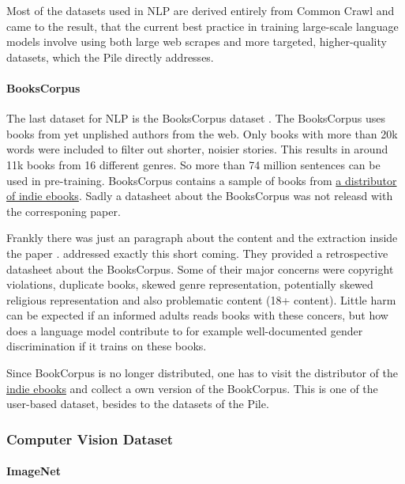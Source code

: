 \documentclass[
]{krantz}
\begin{document}
Most of the datasets used in NLP are derived entirely from Common Crawl and \citet{rosset2020turing} came to the result, that the current best practice in training large-scale language models involve using both large web scrapes and more targeted, higher-quality datasets, which the Pile directly addresses.

\hypertarget{bookscorpus}{%
\paragraph{BooksCorpus}\label{bookscorpus}}

The last dataset for NLP is the BooksCorpus dataset \citep{zhu2015aligning}. The BooksCorpus uses books from yet unplished authors from the web. Only books with more than 20k words were included to filter out shorter, noisier stories. This results in around 11k books from 16 different genres. So more than 74 million sentences can be used in pre-training. BooksCorpus contains a sample of books from \href{https://www.smashwords.com}{a distributor of indie ebooks}. Sadly a datasheet about the BooksCorpus was not releasd with the corresponing paper.

Frankly there was just an paragraph about the content and the extraction inside the paper \citep{zhu2015aligning}. \citet{bandy2021addressing} addressed exactly this short coming. They provided a retrospective datasheet about the BooksCorpus. Some of their major concerns were copyright violations, duplicate books, skewed genre representation, potentially skewed religious representation and also problematic content (18+ content). Little harm can be expected if an informed adults reads books with these concers, but how does a language model contribute to for example well-documented gender discrimination if it trains on these books.

Since BookCorpus is no longer distributed, one has to visit the distributor of the \href{https://www.smashwords.com}{indie ebooks} and collect a own version of the BookCorpus. This is one of the user-based dataset, besides to the datasets of the Pile.

\hypertarget{computer-vision-dataset}{%
\subsubsection{Computer Vision Dataset}\label{computer-vision-dataset}}

\hypertarget{imagenet}{%
\paragraph{ImageNet}\label{imagenet}}
\end{document}
